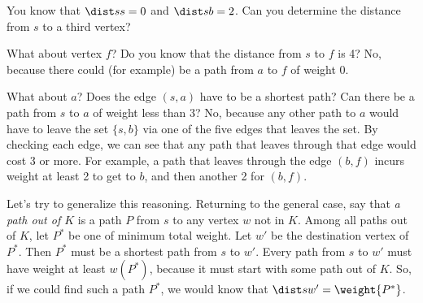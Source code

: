 \begin{center}
\end{center}

You know that $\dist s s=0$ and $\dist s b=2$.
Can you determine the distance from $s$ to a third vertex?

What about vertex $f$? Do you know that the distance from $s$ to $f$ is 4?
No, because there could (for example) be a path from $a$ to $f$ of weight 0.

What about $a$?  Does the edge $(s, a)$ have to be a shortest path?
Can there be a path from $s$ to $a$ of weight less than 3?
No, because any other path to $a$ would have to leave the set $\{s, b\}$
via one of the five edges that leaves the set.
By checking each edge, we can see that any path that leaves through that edge would cost 3 or more.
For example, a path that leaves through the edge $(b, f)$ incurs weight at least 2 to get to $b$,
and then another 2 for $(b, f)$.

Let's try to generalize this reasoning.
Returning to the general case,
say that \emph{a path out of $K$}
is a path $P$ from $s$ to any vertex $w$ not in $K$.
Among all paths out of $K$, let $P^*$ be one of minimum total weight.
Let $w'$ be the destination vertex of $P^*$.
Then $P^*$ must be a shortest path from $s$ to $w'$.
Every path from $s$ to $w'$ must have weight at least $w(P^*)$,
because it must start with some path out of $K$.
So, if we could find such a path $P^*$, we would know that $\dist s {w'} = \weight {P^*}$.

